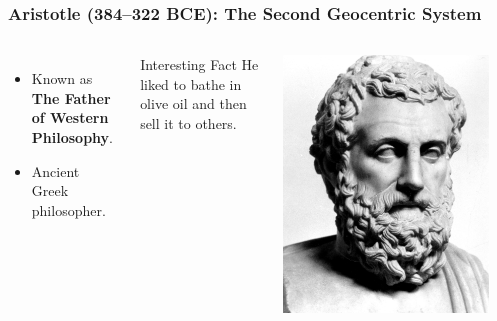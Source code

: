 \documentclass[aspectratio=1611, 9pt]{beamer}
\begin{document}
\begin{frame}
  \frametitle{Aristotle (384–322 BCE): The Second Geocentric System}
  \begin{columns}
    \begin{itemize}
      \item Known as \textbf{The Father of Western Philosophy}.
      \item Ancient Greek philosopher.
    \end{itemize}
    \begin{block}{Interesting Fact}
      He liked to bathe in olive oil and then sell it to others.
    \end{block}

    \begin{center}
      \includegraphics[width=0.9\textwidth]{pictures/aristotle.jpg}
    \end{center}
  \end{columns}
\end{frame}
\end{document}
